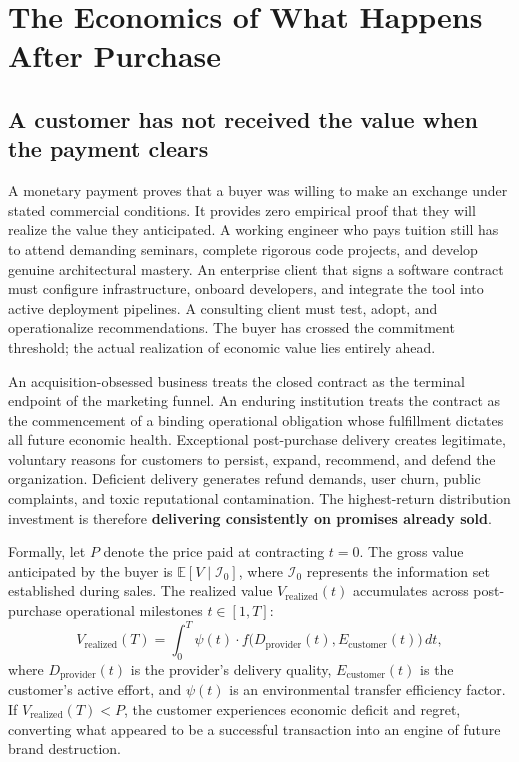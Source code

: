 \section{The Economics of What Happens After Purchase}

\subsection{A customer has not received the value when the payment clears}

A monetary payment proves that a buyer was willing to make an exchange under stated commercial conditions. It provides zero empirical proof that they will realize the value they anticipated. A working engineer who pays tuition still has to attend demanding seminars, complete rigorous code projects, and develop genuine architectural mastery. An enterprise client that signs a software contract must configure infrastructure, onboard developers, and integrate the tool into active deployment pipelines. A consulting client must test, adopt, and operationalize recommendations. The buyer has crossed the commitment threshold; the actual realization of economic value lies entirely ahead.

An acquisition-obsessed business treats the closed contract as the terminal endpoint of the marketing funnel. An enduring institution treats the contract as the commencement of a binding operational obligation whose fulfillment dictates all future economic health. Exceptional post-purchase delivery creates legitimate, voluntary reasons for customers to persist, expand, recommend, and defend the organization. Deficient delivery generates refund demands, user churn, public complaints, and toxic reputational contamination. The highest-return distribution investment is therefore \textbf{delivering consistently on promises already sold}.

Formally, let $P$ denote the price paid at contracting $t = 0$. The gross value anticipated by the buyer is $\mathbb{E}[V \mid \mathcal{I}_0]$, where $\mathcal{I}_0$ represents the information set established during sales. The realized value $V_{\text{realized}}(t)$ accumulates across post-purchase operational milestones $t \in [1, T]$:
\begin{equation}
V_{\text{realized}}(T) = \int_{0}^{T} \psi(t) \cdot f\big(D_{\text{provider}}(t), E_{\text{customer}}(t)\big) \, dt,
\end{equation}
where $D_{\text{provider}}(t)$ is the provider's delivery quality, $E_{\text{customer}}(t)$ is the customer's active effort, and $\psi(t)$ is an environmental transfer efficiency factor. If $V_{\text{realized}}(T) < P$, the customer experiences economic deficit and regret, converting what appeared to be a successful transaction into an engine of future brand destruction.

